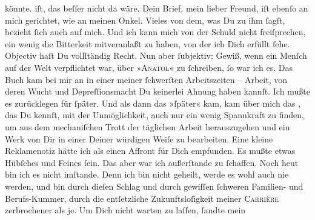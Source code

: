 \begin{ledgroupsized}[t]{13cm}
{{{                  könnte.}}}\label{K_L02709-3h} iſt, das beſſer nicht da wäre. Dein Brief, mein lieber Freund, iſt
                  {\pb}ebenſo an mich gerichtet, wie an meinen Onkel. Vieles von dem, was Du
               zu ihm ſagſt, bezieht ſich auch auf mich. Und ich kann mich von der Schuld nicht
               freiſprechen, ein wenig die Bitterkeit mitveranlaßt zu haben, von der ich Dich
               erfüllt ſehe. Objectiv haſt Du vollſtändig Recht. Nun aber ſubjektiv: Gewiß, wenn ein
               Menſch auf der Welt verpflichtet war, über »\textsc{Anatol}« zu ſchreiben, ſo war ich es. Das Buch kam bei mir an in einer meiner ſchwerſten Arbeitszeiten
               – Arbeit, von deren Wucht und Depreſ{\pb}ſionsmacht Du
               keinerlei Ahnung haben kannſt. Ich mußte es zurücklegen für ſpäter. Und als dann das
               »ſpäter« kam, kam über mich das \label{K_L02709-4v}\label{K_L02709-4h}, das Du kennſt, mit der Unmöglichkeit, auch nur ein
               wenig Spannkraft zu finden, um aus dem mechaniſchen Trott der täglichen Arbeit
               herauszugehen und \strikeout{\textcolor{gray}{×}\-\textcolor{gray}{×}} ein Werk von Dir in
               einer Deiner würdigen Weiſe zu bearbeiten. Eine kleine Reklamenotiz hätte ich als
               einen Affront für Dich empfunden. Es mußte etwas Hübſches und Feines {\pb}ſein. Das aber war ich außerſtande zu ſchaffen. Noch
               heut bin ich es nicht imſtande. Denn ich bin nicht geheilt, werde es wohl auch nie
               werden, und bin durch dieſen Schlag und durch gewiſſen ſchweren Familien- und
               Berufs-Kummer, durch die entſetzliche Zukunftsloſigkeit meiner \textsc{Carrière} zerbrochener als je. Um Dich nicht warten zu laſſen, ſandte mein

\end{ledgroupsized}
